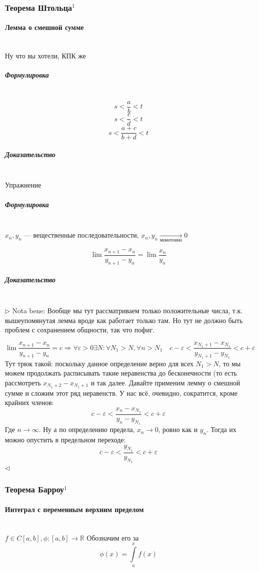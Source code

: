 \documentclass{article}
\let\vanillaparagraph\paragraph
\let\vanillasubparagraph\subparagraph
\renewcommand{\paragraph}[1]{\vanillaparagraph{#1}\mbox{}\\}
\renewcommand{\subparagraph}[1]{\vanillasubparagraph{#1}\mbox{}\\}
\begin{document}
\subsubsection{Теорема Штольца\texorpdfstring{$^1$}{}}
\paragraph{Лемма о смешной сумме}
Ну что вы хотели, КПК же
\subparagraph{Формулировка}
$$
s < \frac ab< t
$$
$$
s < \frac c d < t
$$
$$
s < \frac {a+c}{b+d} < t
$$
\subparagraph{Доказательство}
Упражнение \Smiley

\subparagraph{Формулировка}
$x_n, y_n$ --- вещественные последовательности, $x_n, y_n \underset{\text{монотонно}}{\rightarrow} 0$

$$
\lim \frac{x_{n+1} - x_{n}}{y_{n+1} - y_n} = \lim \frac{x_n}{y_n}
$$

\subparagraph{Доказательство}
$\rhd$
Nota bene: Вообще мы тут рассматриваем только положительные числа, т.к. вышеупомянутая лемма вроде как работает только там. Но тут не должно быть проблем с сохранением общности, так что пофиг.

$$
\lim \frac{x_{n+1} - x_{n}}{y_{n+1} - y_n} = c \Rightarrow \forall \varepsilon > 0 \exists N: \forall N_1 > N, \forall n > N_1 \quad c-\varepsilon < \frac{x_{N_1+1} - x_{N_1}}{y_{N_1+1} - y_{N_1}} < c + \varepsilon
$$
Тут трюк такой: поскольку данное определение верно для всех $N_1 > N$, то мы можем продолжать расписывать такие неравенства до бесконечности (то есть рассмотреть $x_{N_1 + 2} - x_{N_1+1}$ и так далее. Давайте применим лемму о смешной сумме и сложим этот ряд неравенств. У нас всё, очевидно, сократится, кроме крайних членов:
$$
c-\varepsilon < \frac{x_{n} - x_{N_1}}{y_{n} - y_{N_1}} < c + \varepsilon
$$
Где $n \rightarrow \infty$. Ну а по определению предела, $x_n \rightarrow 0$, ровно как и $y_n$. Тогда их можно опустить в предельном переходе: 
$$
c-\varepsilon < \frac{y_{N_1}}{y_{N_1}} < c + \varepsilon
$$
$\lhd$

\subsubsection{Теорема Барроу\texorpdfstring{$^1$}{}}
\paragraph{Интеграл с переменным верхним пределом}
$f\in C[a, b], \phi: [a, b] \rightarrow \mathbb{R}$
Обозначим его за 
$$
\phi(x) = \int\limits_a^x f(x) 
$$
\end{document}
